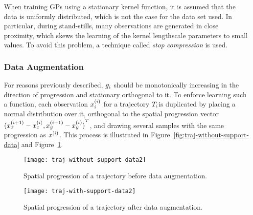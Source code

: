 When training GPs using a stationary kernel function, it is assumed
that the data is uniformly distributed, which is not the case for the
data set used. In particular, during stand-stills, many
observations are generated in close proximity, which skews the
learning of the kernel lengthscale parameters to small values. To
avoid this problem, a technique called \textit{stop compression} is used.

\subsubsection{Data Augmentation}
\label{sec:data-augmentation}
For reasons previously described, $g_{i}$ should be monotonically increasing in
the direction of progression and stationary orthogonal to it.
To enforce learning such a function, each
observation $x_{i}^{(i)}$ for a trajectory $T_{i}$is duplicated by placing a normal distribution
over it, orthogonal to the spatial progression vector ${(x^{(i+1)}_x -
  x^{(i)}_x, x^{(i+1)}_y - x^{(i)}_y)}^T$, and drawing several samples
with the same progression as $x^{(i)}$. This process is illustrated in
Figure~\ref{fig:traj-without-support-data} and
Figure~\ref{fig:traj-with-support-data}.
\begin{figure}
  \begin{minipage}{.46\textwidth}
    \texttt{[image: traj-without-support-data2]}
    \caption{Spatial progression of a trajectory
      before data augmentation.}\label{fig:traj-without-support-data}
  \end{minipage}
  \hspace{5pt}
  \begin{minipage}{.46\textwidth}
    \texttt{[image: traj-with-support-data2]}
    \caption{Spatial progression of a trajectory
      after data augmentation. }\label{fig:traj-with-support-data}
  \end{minipage}
\end{figure}


